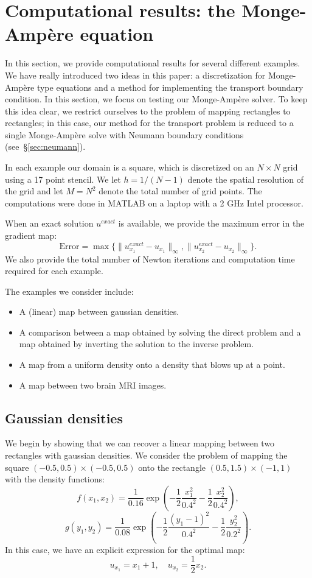 \documentclass{amsart}
\theoremstyle{lemma}
\theoremstyle{remark}
\begin{document}
\section{Computational results: the {{Monge-Amp\`ere}\xspace} equation}\label{sec:resultsMA}
In this section, we provide computational results for several different examples.  We have really introduced two ideas in this paper: a discretization for {{Monge-Amp\`ere}\xspace} type equations and a method for implementing the transport boundary  condition.  In this section, we focus on testing our {{Monge-Amp\`ere}\xspace} solver.  To keep this idea clear, we restrict ourselves to the problem of mapping rectangles to rectangles; in this case, our method for the transport problem is reduced to a single {{Monge-Amp\`ere}\xspace} solve with Neumann boundary conditions (see~\S\ref{sec:neumann}).

In each example our domain is a square, which is discretized on an $N\times N$ grid using a 17 point stencil.  We let $h = 1/(N-1)$ denote the spatial resolution of the grid and let $M = N^2$ denote the total number of grid points.  
The computations were done in MATLAB on a laptop with a 2 GHz Intel processor.  

When an exact solution $u^{exact}$ is available, we provide the maximum error in the gradient map:
\[ \text{Error} = \max\{\|u^{exact}_{x_1}-u_{x_1}\|_\infty,\|u^{exact}_{x_2}-u_{x_2}\|_\infty\}. \]
We also provide the total number of Newton iterations and computation time required for each example.

The examples we consider include:
\begin{itemize}
\item A (linear) map between gaussian densities.
\item A comparison between a map obtained by solving the direct problem and a map obtained by inverting the solution to the inverse problem.
\item A map from a uniform density onto a density that blows up at a point.
\item A map between two brain MRI images.
\end{itemize}

\subsection{Gaussian densities}\label{sec:gaussian}
We begin by showing that we can recover a linear mapping between two rectangles with gaussian densities.  We consider the problem of mapping the square $(-0.5,0.5)\times(-0.5,0.5)$ onto the rectangle $(0.5,1.5)\times(-1,1)$ with the density functions:
\[ f(x_1,x_2) = \frac{1}{0.16}\exp{\left(-\frac{1}{2}\frac{x_1^2}{0.4^2}-\frac{1}{2}\frac{x_2^2}{0.4^2}\right)},\] 
\[g(y_1,y_2) = 
  \frac{1}{0.08}\exp{\left(-\frac{1}{2}\frac{(y_1-1)^2}{0.4^2}-\frac{1}{2}\frac{y_2^2}{0.2^2}\right)}. \]
In this case, we have an explicit expression for the optimal map:
\[ u_{x_1} = x_1 + 1,\quad u_{x_2} = \frac{1}{2}x_2. \]
\end{document}
